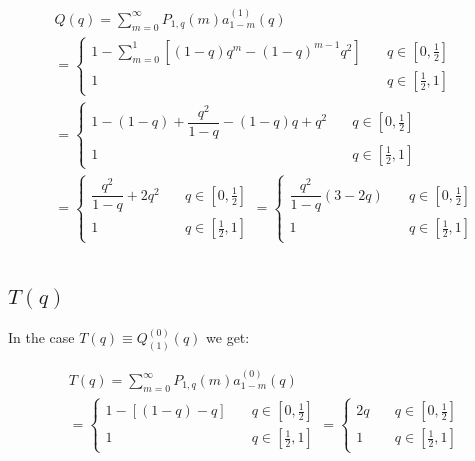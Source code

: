\documentclass[letterpaper,12pt]{report}
\begin{document}
\begin{eqnarray}\label{eq:qnspecific}\nonumber
&\mathit{Q}(q)=\sum_{m=0}^{\infty}\mathit{P}_{1,q}(m)\mathit{a}^{(1)}_{1-m}(q)\\ \nonumber
&=
\begin{cases}
1-\sum_{m=0}^1\left[(1-q)q^m-(1-q)^{m-1}q^2\right] & \quad q \in [0,\frac{1}{2}] \\
1 & \quad q \in [\frac{1}{2},1] 
\end{cases} \\ \nonumber
&=
\begin{cases}
1-(1-q)+\dfrac{q^2}{1-q}-(1-q)q+q^2 & \quad q \in [0,\frac{1}{2}] \\
1 & \quad q \in [\frac{1}{2},1] 
\end{cases} \\ \nonumber
&=
\begin{cases}
\dfrac{q^2}{1-q}+2q^2 & \quad q \in [0,\frac{1}{2}] \\
1 & \quad q \in [\frac{1}{2},1] 
\end{cases} =
\begin{cases}
\dfrac{q^2}{1-q}\left(3-2q\right) & \quad q \in [0,\frac{1}{2}] \\
1 & \quad q \in [\frac{1}{2},1] 
\end{cases} \\ \nonumber
\end{eqnarray}

\subsection{$\mathit{T}(q)$}\label{app:tofq}
In the case $\mathit{T}(q)\equiv\mathit{Q_{(1)}^{(0)}}(q)$ we get:

\begin{eqnarray}\label{eq:qnspecific}\nonumber
&\mathit{T}(q)=\sum_{m=0}^{\infty}\mathit{P}_{1,q}(m)\mathit{a}^{(0)}_{1-m}(q)\\ \nonumber
&=
\begin{cases}
1-\left[(1-q)-q\right] & \quad q \in [0,\frac{1}{2}] \\
1 & \quad q \in [\frac{1}{2},1] 
\end{cases} =
\begin{cases}
2q & \quad q \in [0,\frac{1}{2}] \\
1 & \quad q \in [\frac{1}{2},1] 
\end{cases} \\ \nonumber
\end{eqnarray}



\newpage

\end{document}
